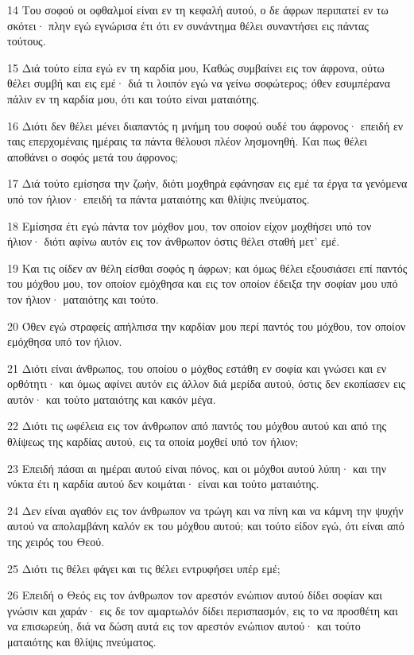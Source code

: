 \par 14 Του σοφού οι οφθαλμοί είναι εν τη κεφαλή αυτού, ο δε άφρων περιπατεί εν τω σκότει· πλην εγώ εγνώρισα έτι ότι εν συνάντημα θέλει συναντήσει εις πάντας τούτους.
\par 15 Διά τούτο είπα εγώ εν τη καρδία μου, Καθώς συμβαίνει εις τον άφρονα, ούτω θέλει συμβή και εις εμέ· διά τι λοιπόν εγώ να γείνω σοφώτερος; όθεν εσυμπέρανα πάλιν εν τη καρδία μου, ότι και τούτο είναι ματαιότης.
\par 16 Διότι δεν θέλει μένει διαπαντός η μνήμη του σοφού ουδέ του άφρονος· επειδή εν ταις επερχομέναις ημέραις τα πάντα θέλουσι πλέον λησμονηθή. Και πως θέλει αποθάνει ο σοφός μετά του άφρονος;
\par 17 Διά τούτο εμίσησα την ζωήν, διότι μοχθηρά εφάνησαν εις εμέ τα έργα τα γενόμενα υπό τον ήλιον· επειδή τα πάντα ματαιότης και θλίψις πνεύματος.
\par 18 Εμίσησα έτι εγώ πάντα τον μόχθον μου, τον οποίον είχον μοχθήσει υπό τον ήλιον· διότι αφίνω αυτόν εις τον άνθρωπον όστις θέλει σταθή μετ' εμέ.
\par 19 Και τις οίδεν αν θέλη είσθαι σοφός η άφρων; και όμως θέλει εξουσιάσει επί παντός του μόχθου μου, τον οποίον εμόχθησα και εις τον οποίον έδειξα την σοφίαν μου υπό τον ήλιον· ματαιότης και τούτο.
\par 20 Όθεν εγώ στραφείς απήλπισα την καρδίαν μου περί παντός του μόχθου, τον οποίον εμόχθησα υπό τον ήλιον.
\par 21 Διότι είναι άνθρωπος, του οποίου ο μόχθος εστάθη εν σοφία και γνώσει και εν ορθότητι· και όμως αφίνει αυτόν εις άλλον διά μερίδα αυτού, όστις δεν εκοπίασεν εις αυτόν· και τούτο ματαιότης και κακόν μέγα.
\par 22 Διότι τις ωφέλεια εις τον άνθρωπον από παντός του μόχθου αυτού και από της θλίψεως της καρδίας αυτού, εις τα οποία μοχθεί υπό τον ήλιον;
\par 23 Επειδή πάσαι αι ημέραι αυτού είναι πόνος, και οι μόχθοι αυτού λύπη· και την νύκτα έτι η καρδία αυτού δεν κοιμάται· είναι και τούτο ματαιότης.
\par 24 Δεν είναι αγαθόν εις τον άνθρωπον να τρώγη και να πίνη και να κάμνη την ψυχήν αυτού να απολαμβάνη καλόν εκ του μόχθου αυτού; και τούτο είδον εγώ, ότι είναι από της χειρός του Θεού.
\par 25 Διότι τις θέλει φάγει και τις θέλει εντρυφήσει υπέρ εμέ;
\par 26 Επειδή ο Θεός εις τον άνθρωπον τον αρεστόν ενώπιον αυτού δίδει σοφίαν και γνώσιν και χαράν· εις δε τον αμαρτωλόν δίδει περισπασμόν, εις το να προσθέτη και να επισωρεύη, διά να δώση αυτά εις τον αρεστόν ενώπιον αυτού· και τούτο ματαιότης και θλίψις πνεύματος.

